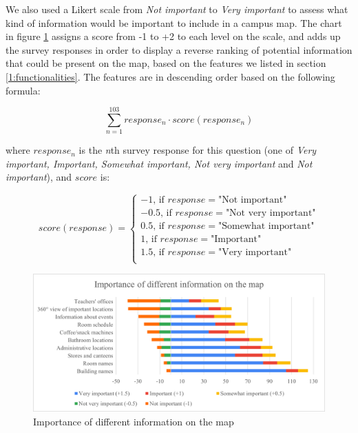         We also used a Likert scale from \textit{Not important} to \textit{Very important} to assess what kind of information would be important to include in a campus map. The chart in figure \ref{4:fig:map_features} assigns a score from -1 to +2 to each level on the scale, and adds up the survey responses in order to display a reverse ranking of potential information that could be present on the map, based on the features we listed in section \ref{1:functionalities}. The features are in descending order based on the following formula:
        
        \[ \sum_{n=1}^{103} response_n \cdot score(response_n) \]
        
        where $response_n$ is the \textit{n}th survey response for this question (one of \textit{Very important, Important, Somewhat important, Not very important} and \textit{Not important}), and $score$ is:
        
        $$
        score(response) = \left\{
            \begin{array}{ll}
                -1\text{, if } response = \text{"Not important"} \\
                -0.5\text{, if } response = \text{"Not very important"} \\
                0.5\text{, if } response = \text{"Somewhat important"} \\
                1\text{, if } response = \text{"Important"} \\
                1.5\text{, if } response = \text{"Very important"} \\
            \end{array}
        \right.
        $$
            
        \begin{figure}[!ht]
            \centering
            \includegraphics[width=\textwidth]{figures/charts/map_features.png}
            \caption{Importance of different information on the map}
            \label{4:fig:map_features}
        \end{figure}
        
